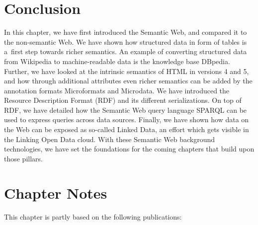 \section{Conclusion}
In this chapter, we have first introduced the Semantic Web,
and compared it to the non-semantic Web.
We have shown how structured data in form of tables
is a~first step towards richer semantics.
An example of converting structured data from Wikipedia
to machine-readable data is the knowledge base DBpedia.
Further, we have looked at the intrinsic semantics
of HTML in versions 4 and 5,
and how through additional attributes
even richer semantics can be added
by the annotation formats Microformats and Microdata.
We have introduced the Resource Description Format (RDF)
and its different serializations.
On top of RDF, we have detailed
how the Semantic Web query language SPARQL
can be used to express queries across data sources.
Finally, we have shown how data on the Web
can be exposed as so-called Linked Data,
an effort which gets visible in the Linking Open Data cloud.
With these Semantic Web background technologies,
we have set the foundations for the coming chapters
that build upon those pillars.

\section*{Chapter Notes}
This chapter is partly based on the following publications:

